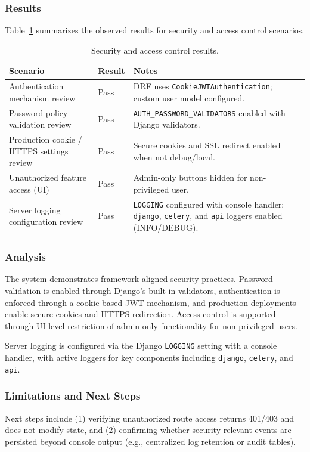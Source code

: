 \documentclass[12pt, titlepage]{article}
\begin{document}
\subsubsection{Results}
Table~\ref{tab:tnf5-results} summarizes the observed results for security and access control scenarios.
\begin{table}[H]
  \centering
  \caption{Security and access control results.}
  \label{tab:tnf5-results}
  \begin{tabular}{@{}p{}p{}p{}@{}}
    \toprule
    \textbf{Scenario} & \textbf{Result} & \textbf{Notes} \\
    \midrule
    Authentication mechanism review &
      Pass &
      DRF uses \texttt{CookieJWTAuthentication}; custom user model configured. \\
    Password policy validation review &
      Pass &
      \texttt{AUTH\_PASSWORD\_VALIDATORS} enabled with Django validators. \\
    Production cookie / HTTPS settings review &
      Pass &
      Secure cookies and SSL redirect enabled when not debug/local. \\
    Unauthorized feature access (UI) &
      Pass &
      Admin-only buttons hidden for non-privileged user. \\
    Server logging configuration review &
      Pass &
      \texttt{LOGGING} configured with console handler; \texttt{django},
      \texttt{celery}, and \texttt{api} loggers enabled (INFO/DEBUG). \\
    \bottomrule
  \end{tabular}
\end{table}

\subsubsection{Analysis}
The system demonstrates framework-aligned security practices. Password
validation is enabled through Django's built-in validators, authentication is
enforced through a cookie-based JWT mechanism, and production deployments
enable secure cookies and HTTPS redirection. Access control is supported
through UI-level restriction of admin-only functionality for non-privileged
users.

Server logging is configured via the Django \texttt{LOGGING} setting with a
console handler, with active loggers for key components including
\texttt{django}, \texttt{celery}, and \texttt{api}.

\subsubsection{Limitations and Next Steps}
Next steps include (1) verifying unauthorized route access returns 401/403 and
does not modify state, and (2) confirming whether security-relevant events are
persisted beyond console output (e.g., centralized log retention or audit
tables).
\end{document}
